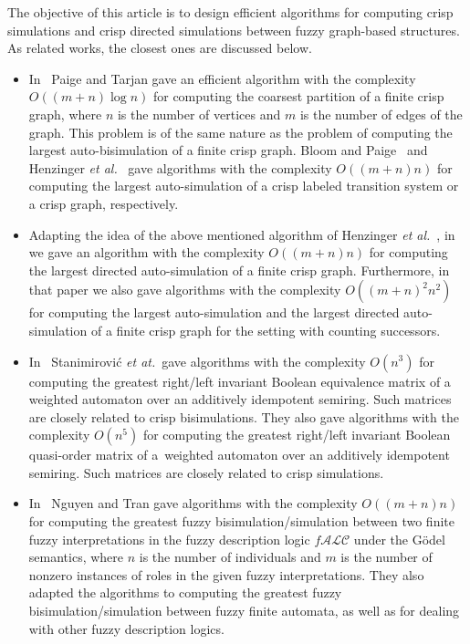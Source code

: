 \documentclass[11pt]{article}
\newcommand{\fALC}{$\mathit{f}\!\mathcal{ALC}$\xspace}
\begin{document}
The objective of this article is to design efficient algorithms for computing crisp simulations and crisp directed simulations between fuzzy graph-based structures. As related works, the closest ones are discussed below.
\begin{itemize}
\item In~\cite{PaigeT87} Paige and Tarjan gave an efficient algorithm with the complexity $O((m+n)\log{n})$ for computing the coarsest partition of a finite crisp graph, where $n$ is the number of vertices and $m$ is the number of edges of the graph. This problem is of the same nature as the problem of computing the largest auto-bisimulation of a finite crisp graph. Bloom and Paige~\cite{BloomP95} and Henzinger {\em et al.}~\cite{HenzingerHK95} gave algorithms with the complexity $O((m + n)n)$ for computing the largest auto-simulation of a crisp labeled transition system or a crisp graph, respectively. 

\item Adapting the idea of the above mentioned algorithm of Henzinger {\em et al.}~\cite{HenzingerHK95}, in~\cite{CompBSDLP} we gave an algorithm with the complexity $O((m + n)n)$ for computing the largest directed auto-simulation of a finite crisp graph. Furthermore, in that paper we also gave algorithms with the complexity \mbox{$O((m + n)^2 n^2)$} for computing the largest auto-simulation and the largest directed auto-simulation of a finite crisp graph for the setting with counting successors.

\item In~\cite{StanimirovicSC2019} Stanimirovi{\'c} {\em et at.}\ gave algorithms with the complexity $O(n^3)$ for computing the greatest right/left invariant Boolean equivalence matrix of a weighted automaton over an additively idempotent semiring. Such matrices are closely related to crisp bisimulations. They also gave algorithms with the complexity $O(n^5)$ for computing the greatest right/left invariant Boolean quasi-order matrix of a~weighted automaton over an additively idempotent semiring. Such matrices are closely related to crisp simulations. 

\item In~\cite{TFS2020} Nguyen and Tran gave algorithms with the complexity $O((m + n)n)$ for computing the greatest fuzzy bisimulation/simulation between two finite fuzzy interpretations in the fuzzy description logic \fALC under the G\"odel semantics, where $n$ is the number of individuals and $m$ is the number of nonzero instances of roles in the given fuzzy interpretations. They also adapted the algorithms to computing the greatest fuzzy bisimulation/simulation between fuzzy finite automata, as well as for dealing with other fuzzy description logics.
\end{itemize}
\end{document}
